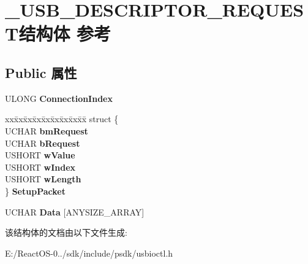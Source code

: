\hypertarget{struct___u_s_b___d_e_s_c_r_i_p_t_o_r___r_e_q_u_e_s_t}{}\section{\+\_\+\+U\+S\+B\+\_\+\+D\+E\+S\+C\+R\+I\+P\+T\+O\+R\+\_\+\+R\+E\+Q\+U\+E\+S\+T结构体 参考}
\label{struct___u_s_b___d_e_s_c_r_i_p_t_o_r___r_e_q_u_e_s_t}
\subsection*{Public 属性}
\begin{DoxyCompactItemize}
\item 
\mbox{\label{struct___u_s_b___d_e_s_c_r_i_p_t_o_r___r_e_q_u_e_s_t_a50c03c93e252a3d8bf4de07d039e9924}} 
U\+L\+O\+NG {\bfseries Connection\+Index}
\item 
\mbox{\label{struct___u_s_b___d_e_s_c_r_i_p_t_o_r___r_e_q_u_e_s_t_aa917b98854f763b9a90b8f72594c7b78}} 
\begin{tabbing}
xx\=xx\=xx\=xx\=xx\=xx\=xx\=xx\=xx\=\kill
struct \{\\
\>UCHAR {\bfseries bmRequest}\\
\>UCHAR {\bfseries bRequest}\\
\>USHORT {\bfseries wValue}\\
\>USHORT {\bfseries wIndex}\\
\>USHORT {\bfseries wLength}\\
\} {\bfseries SetupPacket}\\

\end{tabbing}\item 
\mbox{\label{struct___u_s_b___d_e_s_c_r_i_p_t_o_r___r_e_q_u_e_s_t_a83493abbe14f52d255da7491882bb43b}} 
U\+C\+H\+AR {\bfseries Data} \mbox{[}A\+N\+Y\+S\+I\+Z\+E\+\_\+\+A\+R\+R\+AY\mbox{]}
\end{DoxyCompactItemize}


该结构体的文档由以下文件生成\+:\begin{DoxyCompactItemize}
\item 
E\+:/\+React\+O\+S-\/0../sdk/include/psdk/usbioctl.\+h\end{DoxyCompactItemize}

